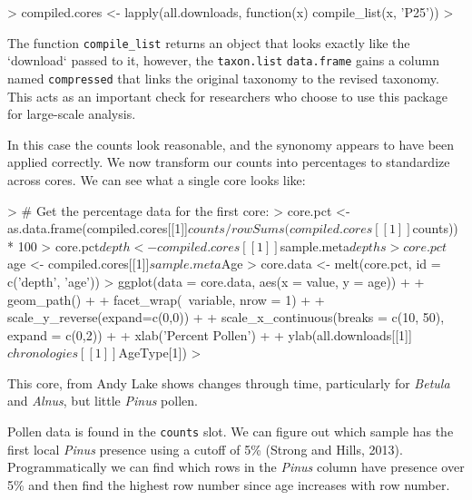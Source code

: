 \documentclass{article}
\begin{document}
{\begin{Schunk}
\begin{Sinput}
> compiled.cores <- lapply(all.downloads, function(x) compile_list(x, 'P25'))
> 
\end{Sinput}
\end{Schunk}

The function \texttt{compile_list} returns an object that looks exactly like the `download` passed to it, however, the \texttt{taxon.list} \texttt{data.frame} gains a column named \texttt{compressed} that links the original taxonomy to the revised taxonomy.  This acts as an important check for researchers who choose to use this package for large-scale analysis.

In this case the counts look reasonable, and the synonomy appears to have been applied correctly.  We now transform our counts into percentages to standardize across cores.  We can see what a single core looks like:

\begin{Schunk}
\begin{Sinput}
> #  Get the percentage data for the first core:
> core.pct <- as.data.frame(compiled.cores[[1]]$counts / rowSums(compiled.cores[[1]]$counts)) * 100
> core.pct$depth <- compiled.cores[[1]]$sample.meta$depths
> core.pct$age <- compiled.cores[[1]]$sample.meta$Age
> core.data <- melt(core.pct, id = c('depth', 'age'))
> ggplot(data = core.data, aes(x = value, y = age)) + 
+   geom_path() + 
+   facet_wrap(~variable, nrow = 1) +
+   scale_y_reverse(expand=c(0,0)) +
+   scale_x_continuous(breaks = c(10, 50), expand = c(0,2)) +
+   xlab('Percent Pollen') +
+   ylab(all.downloads[[1]]$chronologies[[1]]$AgeType[1])
> 
\end{Sinput}
\end{Schunk}

This core, from Andy Lake shows changes through time, particularly for \emph{Betula} and \emph{Alnus}, but little \emph{Pinus} pollen.

Pollen data is found in the \texttt{counts} slot.  We can figure out which sample has the first local \emph{Pinus} presence using a cutoff of 5\% (Strong and Hills, 2013).  Programmatically we can find which rows in the \emph{Pinus} column have presence over 5\% and then find the highest row number since age increases with row number.

}
\end{document}
